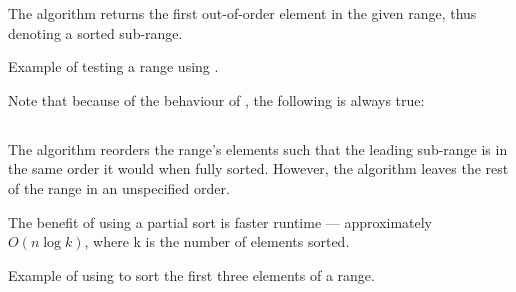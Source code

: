 The  algorithm returns the first out-of-order element in the given range, thus denoting a sorted sub-range.


\begin{codebox}[]{\href{https://compiler-explorer.com/z/1dvboE6b1}{\ExternalLink}}
\footnotesize Example of testing a range using .
\tcblower
{}
\end{codebox}

Note that because of the behaviour of , the following is always true:\\
\begin{small}\end{small}

\subsection{\texorpdfstring{}{\texttt{std::partial\_sort}}}

The  algorithm reorders the range's elements such that the leading sub-range is in the same order it would when fully sorted. However, the algorithm leaves the rest of the range in an unspecified order.



The benefit of using a partial sort is faster runtime — approximately $O(n \log k)$, where k is the number of elements sorted.

\begin{codebox}[]{\href{https://compiler-explorer.com/z/j6xjM4GnT}{\ExternalLink}}
\footnotesize Example of using  to sort the first three elements of a range.
\tcblower
{}
\end{codebox}

\subsection{\texorpdfstring{}{\texttt{std::partial\_sort\_copy}}}

